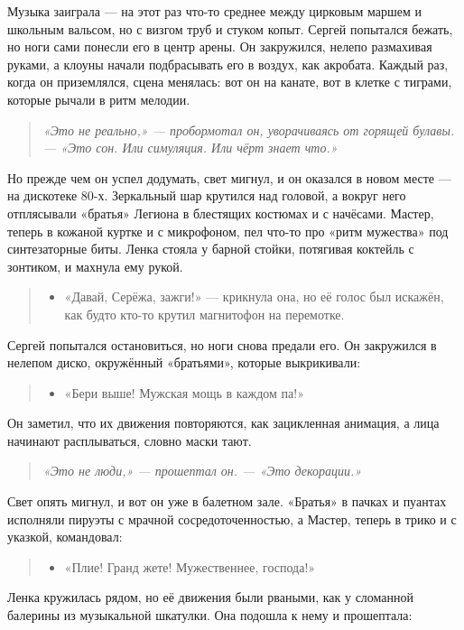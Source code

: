\documentclass[12pt,a4paper]{book}
\newenvironment{dialogue}{\begin{quote}\itshape\begin{itemize}\item[]}{\end{itemize}\end{quote}}
\newenvironment{innerthought}{\begin{quote}\small\itshape}{\end{quote}}
\begin{document}
Музыка заиграла --- на этот раз что-то среднее между цирковым маршем и школьным вальсом, но с визгом труб и стуком копыт. Сергей попытался бежать, но ноги сами понесли его в центр арены. Он закружился, нелепо размахивая руками, а клоуны начали подбрасывать его в воздух, как акробата. Каждый раз, когда он приземлялся, сцена менялась: вот он на канате, вот в клетке с тиграми, которые рычали в ритм мелодии.

\begin{innerthought}
«Это не реально,» --- пробормотал он, уворачиваясь от горящей булавы. --- «Это сон. Или симуляция. Или чёрт знает что.»
\end{innerthought}

Но прежде чем он успел додумать, свет мигнул, и он оказался в новом месте --- на дискотеке 80-х. Зеркальный шар крутился над головой, а вокруг него отплясывали «братья» Легиона в блестящих костюмах и с начёсами. Мастер, теперь в кожаной куртке и с микрофоном, пел что-то про «ритм мужества» под синтезаторные биты. Ленка стояла у барной стойки, потягивая коктейль с зонтиком, и махнула ему рукой.

\begin{dialogue}
«Давай, Серёжа, зажги!» --- крикнула она, но её голос был искажён, как будто кто-то крутил магнитофон на перемотке.
\end{dialogue}

Сергей попытался остановиться, но ноги снова предали его. Он закружился в нелепом диско, окружённый «братьями», которые выкрикивали:

\begin{dialogue}
«Бери выше! Мужская мощь в каждом па!»
\end{dialogue}

Он заметил, что их движения повторяются, как зацикленная анимация, а лица начинают расплываться, словно маски тают.

\begin{innerthought}
«Это не люди,» --- прошептал он. --- «Это декорации.»
\end{innerthought}

Свет опять мигнул, и вот он уже в балетном зале. «Братья» в пачках и пуантах исполняли пируэты с мрачной сосредоточенностью, а Мастер, теперь в трико и с указкой, командовал:

\begin{dialogue}
«Плие! Гранд жете! Мужественнее, господа!»
\end{dialogue}

Ленка кружилась рядом, но её движения были рваными, как у сломанной балерины из музыкальной шкатулки. Она подошла к нему и прошептала:
\end{document}
